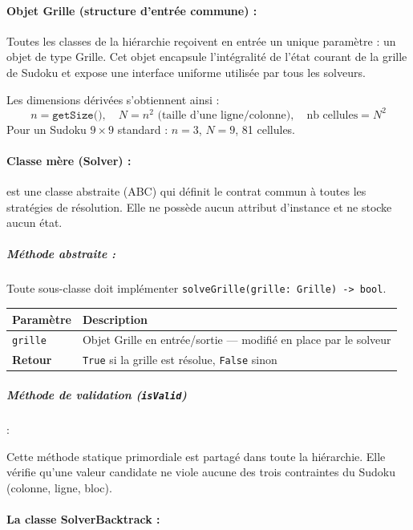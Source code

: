 \documentclass[a4paper]{article}
\begin{document}
\paragraph{Objet Grille (structure d'entrée commune) :}

Toutes les classes de la hiérarchie reçoivent en entrée un unique paramètre : un objet de
type Grille. Cet objet encapsule l'intégralité de l'état courant de la grille de
Sudoku et expose une interface uniforme utilisée par tous les solveurs.

\medskip
Les dimensions dérivées s'obtiennent ainsi :
\[
  n = \texttt{getSize()},\quad N = n^2 \text{ (taille d'une ligne/colonne)},
  \quad \text{nb cellules} = N^2
\]
Pour un Sudoku $9 \times 9$ standard : $n = 3$, $N = 9$, 81 cellules.


\paragraph{Classe mère (Solver) :}
est une classe abstraite (ABC) qui définit le contrat commun à
toutes les stratégies de résolution. Elle ne possède aucun attribut d'instance et ne stocke
aucun état.

\subparagraph{Méthode abstraite :}
Toute sous-classe doit implémenter \texttt{solveGrille(grille: Grille) -> bool}.

\begin{center}
\begin{tabular}{lp{9cm}}
  \toprule
  \textbf{Paramètre} & \textbf{Description} \\
  \midrule
  \texttt{grille} & Objet Grille en entrée/sortie — modifié en place par le solveur \\
  \textbf{Retour} & \texttt{True} si la grille est résolue, \texttt{False} sinon \\
  \bottomrule
\end{tabular}
\end{center}

\subparagraph{Méthode de validation (\texttt{isValid})}:

Cette méthode statique  primordiale est partagé dans toute la hiérarchie. Elle vérifie
qu'une valeur candidate ne viole aucune des trois contraintes du Sudoku (colonne, ligne,
bloc).


\paragraph{La classe SolverBacktrack :}
\end{document}
